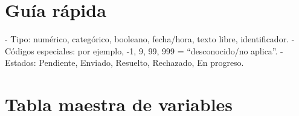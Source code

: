 \documentclass[11pt,a4paper]{article}
\begin{document}
\section*{Guía rápida}
- Tipo: numérico, categórico, booleano, fecha/hora, texto libre, identificador. 
- Códigos especiales: por ejemplo, -1, 9, 99, 999 = “desconocido/no aplica”. 
- Estados: Pendiente, Enviado, Resuelto, Rechazado, En progreso.

\section{Tabla maestra de variables}
\small %

\setlength{\LTleft}{\fill}
\setlength{\LTright}{\fill}

\setlength{\arrayrulewidth}{0.6pt}
\end{document}
